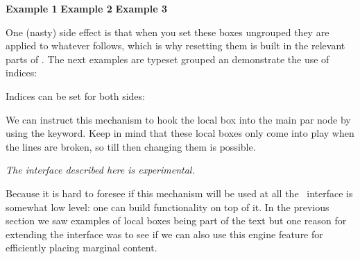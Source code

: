 \typebuffer[example-3][option=TEX]

\startplacefigure %
    \startcombination[nx=1,ny=3]
        {\vbox{\hsize\textwidth\getbuffer[example-1]}} {\bf Example 1}
        {\vbox{\hsize\textwidth\getbuffer[example-2]}} {\bf Example 2}
        {\vbox{\hsize\textwidth\getbuffer[example-3]}} {\bf Example 3}
    \stopcombination
\stopplacefigure

One (nasty) side effect is that when you set these boxes ungrouped they are
applied to whatever follows, which is why resetting them is built in the relevant
parts of \CONTEXT. The next examples are typeset grouped an demonstrate the use
of indices:

\startbuffer
{}
%
%
\stopbuffer

\typebuffer[option=TEX] \start \getbuffer \par \stop

Indices can be set for both sides:

\startbuffer
{}%
%
\stopbuffer

\typebuffer[option=TEX] \start \getbuffer \par \stop

We can instruct this mechanism to hook the local box into the main
par node by using the  keyword. Keep in mind that these
local boxes only come into play when the lines are broken, so till
then changing them is possible.

\startbuffer
{}%
%
\stopbuffer

\typebuffer[option=TEX] \start \getbuffer \par \stop

\stopsectionlevel

\startsectionlevel[title=The interface]

{\em The interface described here is experimental.}

Because it is hard to foresee if this mechanism will be used at all the \CONTEXT\
interface is somewhat low level: one can build functionality on top of it. In the
previous section we saw examples of local boxes being part of the text but one
reason for extending the interface was to see if we can also use this engine
feature for efficiently placing marginal content.

